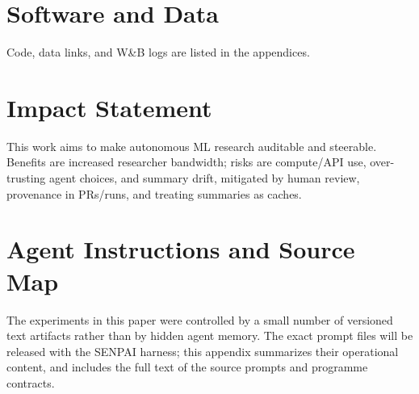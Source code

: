 \documentclass{article}
\begin{document}
\section*{Software and Data}

Code, data links, and W\&B logs are listed in the appendices.

\section*{Impact Statement}

This work aims to make autonomous ML research auditable and steerable. Benefits are increased researcher bandwidth; risks are compute/API use, over-trusting agent choices, and summary drift, mitigated by human review, provenance in PRs/runs, and treating summaries as caches.




\clearpage
\onecolumn
\appendix

\section{Agent Instructions and Source Map}
\label{app:agent-instructions}

The experiments in this paper were controlled by a small number of versioned text artifacts rather than by hidden agent memory. The exact prompt files will be released with the SENPAI harness; this appendix summarizes their operational content, and  includes the full text of the source prompts and programme contracts.
\end{document}
